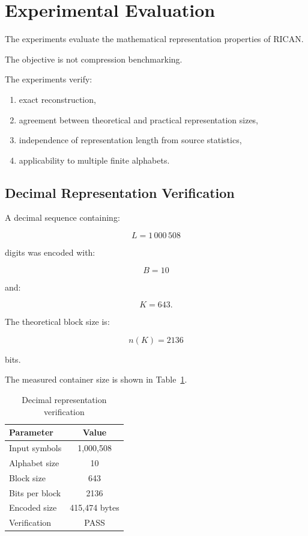 \documentclass[onecolumn]{IEEEtran}
\begin{document}

\section{Experimental Evaluation}

The experiments evaluate the mathematical representation properties of
RICAN.

The objective is not compression benchmarking.

The experiments verify:

\begin{enumerate}

\item exact reconstruction,

\item agreement between theoretical and practical representation sizes,

\item independence of representation length from source statistics,

\item applicability to multiple finite alphabets.

\end{enumerate}

\subsection{Decimal Representation Verification}

A decimal sequence containing:

\[
L=1\,000\,508
\]

digits was encoded with:

\[
B=10
\]

and:

\[
K=643 .
\]

The theoretical block size is:

\[
n(K)=2136
\]

bits.

The measured container size is shown in Table~\ref{tab:decimal-validation}.

\begin{table}[!t]
\caption{Decimal representation verification}
\label{tab:decimal-validation}
\centering
\begin{tabular}{lc}
\toprule
Parameter & Value\\
\midrule
Input symbols & 1,000,508\\
Alphabet size & 10\\
Block size & 643\\
Bits per block & 2136\\
Encoded size & 415,474 bytes\\
Verification & PASS\\
\bottomrule
\end{tabular}
\end{table}
\end{document}
